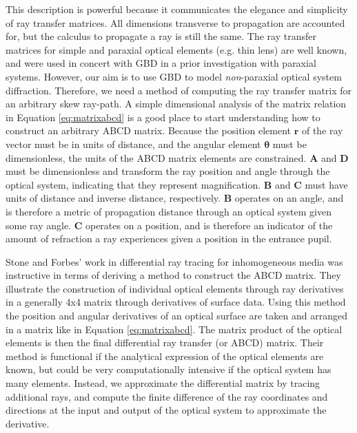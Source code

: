 This description is powerful because it communicates the elegance and simplicity of ray transfer matrices. All dimensions transverse to propagation are accounted for, but the calculus to propagate a ray is still the same. The ray transfer matrices for simple and paraxial optical elements (e.g. thin lens) are well known\cite{Brouwer64}, and were used in concert with GBD in a prior investigation with paraxial systems\cite{Ashcraft2020}. However, our aim is to use GBD to model \emph{non}-paraxial optical system diffraction. Therefore, we need a method of computing the ray transfer matrix for an arbitrary skew ray-path. 
A simple dimensional analysis of the matrix relation in Equation \ref{eq:matrixabcd} is a good place to start understanding how to construct an arbitrary ABCD matrix. Because the position element $\mathbf{r}$ of the ray vector must be in units of distance, and the angular element $\boldsymbol{\theta}$ must be dimensionless, the units of the ABCD matrix elements are constrained. $\mathbf{A}$ and $\mathbf{D}$ must be dimensionless and transform the ray position and angle through the optical system, indicating that they represent magnification. $\mathbf{B}$ and $\mathbf{C}$ must have units of distance and inverse distance, respectively. $\mathbf{B}$ operates on an angle, and is therefore a metric of propagation distance through an optical system given some ray angle. $\mathbf{C}$ operates on a position, and is therefore an indicator of the amount of refraction a ray experiences given a position in the entrance pupil.

Stone and Forbes'\cite{Stone:97} work in differential ray tracing for inhomogeneous media was instructive in terms of deriving a method to construct the ABCD matrix. They illustrate the construction of individual optical elements through ray derivatives in a generally 4x4 matrix through derivatives of surface data. Using this method the position and angular derivatives of an optical surface are taken and arranged in a matrix like in Equation \ref{eq:matrixabcd}. The matrix product of the optical elements is then the final differential ray transfer (or ABCD) matrix. Their method is functional if the analytical expression of the optical elements are known, but could be very computationally intensive if the optical system has many elements. Instead, we approximate the differential matrix by tracing additional rays, and compute the finite difference of the ray coordinates and directions at the input and output of the optical system to approximate the derivative.

